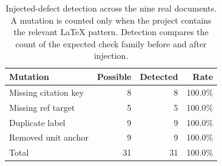 \begin{table}[t]
\centering
\small
\caption{Injected-defect detection across the nine real documents. A mutation is counted only when the project contains the relevant \LaTeX{} pattern. Detection compares the count of the expected check family before and after injection.}
\label{tab:defects}
\begin{tabular}{@{}lrrr@{}}
\toprule
Mutation & Possible & Detected & Rate \\
\midrule
Missing citation key & 8 & 8 & 100.0\% \\
Missing ref target & 5 & 5 & 100.0\% \\
Duplicate label & 9 & 9 & 100.0\% \\
Removed unit anchor & 9 & 9 & 100.0\% \\
\midrule
Total & 31 & 31 & 100.0\% \\
\bottomrule
\end{tabular}
\end{table}
